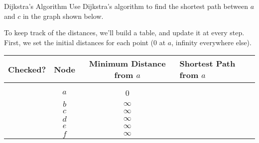 \begin{example}[https://www.youtube.com/watch?v=ziS-j9eBoIo&list=PLfmpjsIzhztst_PxJXo574wshSwxU9Yg_&index=9]{Dijkstra's Algorithm}
Use Dijkstra's algorithm to find the shortest path between $a$ and $c$ in the graph shown below.
\begin{center}
\end{center}

\sol
To keep track of the distances, we'll build a table, and update it at every step.  First, we set the initial distances for each point (0 at $a$, infinity everywhere else).
\begin{center}
\begin{tabular}{c c c l}
\textbf{Checked?} & \textbf{Node} & \textbf{Minimum Distance from $a$} & \textbf{Shortest Path from $a$}\\
\hline
& & \\
& $a$ & 0 & \\
& $b$ & $\infty$ & \\
& $c$ & $\infty$ & \\
& $d$ & $\infty$ & \\
& $e$ & $\infty$ & \\
& $f$ & $\infty$ & \\
\end{tabular}
\end{center}


\end{example}
